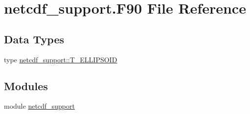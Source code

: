 \hypertarget{netcdf__support_8_f90}{
\section{netcdf\_\-support.F90 File Reference}
\label{netcdf__support_8_f90}
}
\subsection*{Data Types}
\begin{DoxyCompactItemize}
\item 
type \hyperlink{typenetcdf__support_1_1_t___e_l_l_i_p_s_o_i_d}{netcdf\_\-support::T\_\-ELLIPSOID}
\end{DoxyCompactItemize}
\subsection*{Modules}
\begin{DoxyCompactItemize}
\item 
module \hyperlink{namespacenetcdf__support}{netcdf\_\-support}
\end{DoxyCompactItemize}

